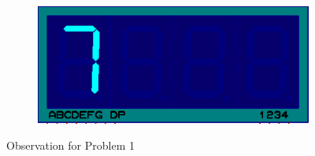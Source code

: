 \documentclass{lab_sheet}
\begin{document}
\begin{figure}[H]
\begin{subfigure}{.33\textwidth}
    \caption{}
    \label{fig:prob1-k}
  \end{subfigure}
  \begin{subfigure}{.33\textwidth}
    \centering
    \includegraphics[frame,width=.9\linewidth]{../Figures/s7}   
    \caption{}
    \label{fig:prob1-l}
  \end{subfigure}
\caption{Observation for Problem 1}
\label{fig:prob1}
\end{figure}
\end{document}
